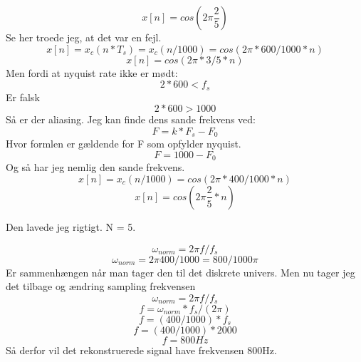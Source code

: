 \begin{EksamensOpgaver}
\begin{Eksamenssæt}[2022 - Forbedringer]
\begin{eksamensOpgave}
        \end{eksamensOpgave}
        \begin{eksamensOpgave}
            \begin{UnderOpgave}
                \[x[n] = cos(2\pi \frac{2}{5})\]
                Se her troede jeg, at det var en fejl. 
                \[x[n] = x_c(n*T_s) = x_c(n/1000) = cos(2\pi * 600/1000 * n)\]
                \[x[n] = cos(2\pi*3/5 * n)\]
                Men fordi at nyquist rate ikke er mødt: 
                \[2 * 600 < f_s\]
                Er falsk
                \[2 * 600 > 1000\]
                Så er der aliasing. 
                Jeg kan finde dens sande frekvens ved: 
                \[F = k*F_s - F_0\]
                Hvor formlen er gældende for F som opfylder nyquist. 
                \[F = 1000 - F_0\]
                Og så har jeg nemlig den sande frekvens.
                \[x[n] = x_c(n/1000) = cos(2\pi * 400/1000 * n)\]
                \[x[n] = cos(2\pi \frac{2}{5} * n)\]
            \end{UnderOpgave}
            \begin{UnderOpgave}
                Den lavede jeg rigtigt. N = 5.
            \end{UnderOpgave}
            \begin{UnderOpgave}
                \[\omega_{norm} = 2\pi f/f_s\]
                \[\omega_{norm} = 2\pi 400/1000 = 800/1000\pi\]
                Er sammenhængen når man tager den til det diskrete univers. 
                Men nu tager jeg det tilbage og ændring sampling frekvensen
                \[\omega_{norm} = 2\pi f/f_s\]
                \[f = \omega_{norm}*f_s/(2\pi)\]
                \[f = (400/1000)*f_s\]
                \[f = (400/1000)*2000\]
                \[f = 800Hz\]
                Så derfor vil det rekonstruerede signal have frekvensen 800Hz. 
                
            \end{UnderOpgave}
            
        \end{eksamensOpgave}
        \begin{eksamensOpgave}
            

\end{eksamensOpgave}
\end{Eksamenssæt}
\end{EksamensOpgaver}
